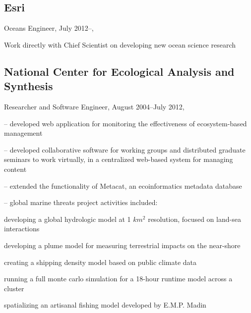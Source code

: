 \documentclass[letterpaper]{article}
\renewenvironment{itemize}{
  \begin{list}{}{
    \setlength{\leftmargin}{1.5em}
  }
}{
  \end{list}
}
\begin{document}
\subsection*{Esri}
\begin{itemize}
\item Oceans Engineer, July 2012--,
  \begin{itemize}
    \item Work directly with Chief Scientist on developing new ocean science research
   \end{itemize}
\end{itemize}

\subsection*{National Center for Ecological Analysis and Synthesis}
\begin{itemize}
\item Researcher and Software Engineer, August 2004--July 2012,
  \begin{itemize}
    \item -- developed web application for monitoring the effectiveness of ecosystem-based management
    \item -- developed collaborative software for working groups and distributed graduate seminars to work virtually, in a centralized web-based system for managing content
    \item -- extended the functionality of Metacat, an ecoinformatics metadata database
    \item -- global marine threats project activities included:
      \begin{itemize}
        \item developing a global hydrologic model at 1 $km^2$ resolution, focused on land-sea interactions
        \item developing a plume model for measuring terrestrial impacts on the near-shore
        \item creating a shipping density model based on public climate data
        \item running a full monte carlo simulation for a 18-hour runtime model across a cluster
        \item spatializing an artisanal fishing model developed by E.M.P. Madin
      \end{itemize}
  \end{itemize}
\end{itemize}
\end{document}

